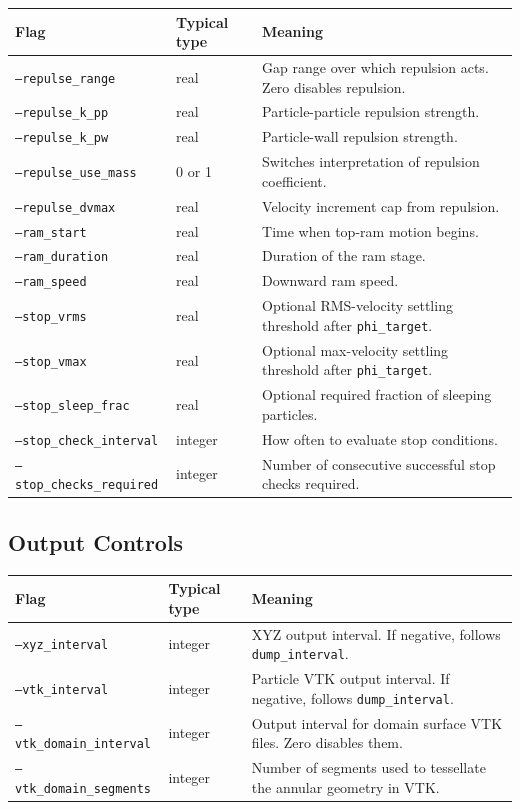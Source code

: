 \documentclass[11pt]{article}
\begin{document}
\begin{longtable}{p{}p{}p{}}
\toprule
\textbf{Flag} & \textbf{Typical type} & \textbf{Meaning} \\
\midrule
\endhead
\texttt{--repulse\_range} & real & Gap range over which repulsion acts. Zero disables repulsion. \\
\texttt{--repulse\_k\_pp} & real & Particle-particle repulsion strength. \\
\texttt{--repulse\_k\_pw} & real & Particle-wall repulsion strength. \\
\texttt{--repulse\_use\_mass} & 0 or 1 & Switches interpretation of repulsion coefficient. \\
\texttt{--repulse\_dvmax} & real & Velocity increment cap from repulsion. \\
\texttt{--ram\_start} & real & Time when top-ram motion begins. \\
\texttt{--ram\_duration} & real & Duration of the ram stage. \\
\texttt{--ram\_speed} & real & Downward ram speed. \\
\texttt{--stop\_vrms} & real & Optional RMS-velocity settling threshold after \texttt{phi\_target}. \\
\texttt{--stop\_vmax} & real & Optional max-velocity settling threshold after \texttt{phi\_target}. \\
\texttt{--stop\_sleep\_frac} & real & Optional required fraction of sleeping particles. \\
\texttt{--stop\_check\_interval} & integer & How often to evaluate stop conditions. \\
\texttt{--stop\_checks\_required} & integer & Number of consecutive successful stop checks required. \\
\bottomrule
\end{longtable}

\subsection{Output Controls}

\begin{longtable}{p{}p{}p{}}
\toprule
\textbf{Flag} & \textbf{Typical type} & \textbf{Meaning} \\
\midrule
\endhead
\texttt{--xyz\_interval} & integer & XYZ output interval. If negative, follows \texttt{dump\_interval}. \\
\texttt{--vtk\_interval} & integer & Particle VTK output interval. If negative, follows \texttt{dump\_interval}. \\
\texttt{--vtk\_domain\_interval} & integer & Output interval for domain surface VTK files. Zero disables them. \\
\texttt{--vtk\_domain\_segments} & integer & Number of segments used to tessellate the annular geometry in VTK. \\
\bottomrule
\end{longtable}
\end{document}
